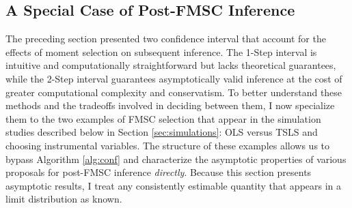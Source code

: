 \subsection{A Special Case of Post-FMSC Inference}
\label{sec:limitexperiment}
The preceding section presented two confidence interval that account for the effects of moment selection on subsequent inference.
The 1-Step interval is intuitive and computationally straightforward but lacks theoretical guarantees, while the 2-Step interval guarantees asymptotically valid inference at the cost of greater computational complexity and conservatism.
To better understand these methods and the tradeoffs involved in deciding between them, I now specialize them to the two examples of FMSC selection that appear in the simulation studies described below in Section \ref{sec:simulations}: OLS versus TSLS and choosing instrumental variables.
The structure of these examples allows us to bypass Algorithm \ref{alg:conf} and characterize the asymptotic properties of various proposals for post-FMSC inference \emph{directly}.
Because this section presents asymptotic results, I treat any consistently estimable quantity that appears in a limit distribution as known.

